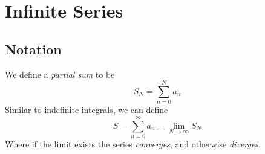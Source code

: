 \documentclass{report}
\begin{document}
\section{Infinite Series} %

\subsection{Notation} %
We define a \textit{partial sum} to be 
\begin{equation*}
S_N=\sum^N_{n=0}a_n
\end{equation*}
Similar to indefinite integrals, we can define
\begin{equation*}
S=\sum^\infty_{n=0}a_n=\lim_{N\to\infty}S_N
\end{equation*}
Where if the limit exists the series \textit{converges}, and otherwise \textit{diverges}.
\end{document}
